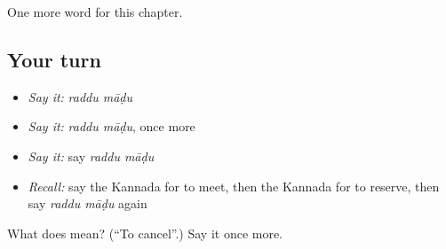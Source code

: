 \begin{grammarlens}[title={What you've built}]
One more word for this chapter.
\end{grammarlens}

\subsection*{Your turn}
\begin{itemize}
\raggedright
  \item \emph{Say it:} \emph{raddu māḍu}
  \item \emph{Say it:} \emph{raddu māḍu}, once more
  \item \emph{Say it:} say \emph{raddu māḍu}
  \item \emph{Recall:} say the Kannada for to meet, then the Kannada for to reserve, then say \emph{raddu māḍu} again
\end{itemize}

\begin{tcolorbox}[breakable,colback=teal!4,colframe=teal!35!black,title={Before you move on}]
What does   mean? (\textquotedblleft{}To cancel\textquotedblright{}.) Say it once more.
\end{tcolorbox}
